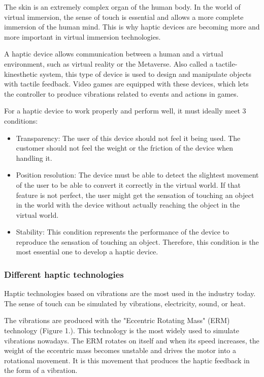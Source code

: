 \documentclass[12pt, a4paper]{article}
\begin{document}
\begin{multicols}{2}
\par The skin is an extremely complex organ of the human body. In the world of virtual immersion, the sense of touch is essential and allows a more complete immersion of the human mind. This is why haptic devices are becoming more and more important in virtual immersion technologies.
\par A haptic device allows communication between a human and a virtual environment, such as virtual reality or the Metaverse. Also called a tactile-kinesthetic system, this type of device is used to design and manipulate objects with tactile feedback. Video games are equipped with these devices, which lets the controller to produce vibrations related to events and actions in games.\cite{haptic5}
\par For a haptic device to work properly and perform well, it must ideally meet 3 conditions:
\begin{itemize}
    \item Transparency: The user of this device should not feel it being used. The customer should not feel the weight or the friction of the device when handling it.
    \item Position resolution: The device must be able to detect the slightest movement of the user to be able to convert it correctly in the virtual world. If that feature is not perfect, the user might get the sensation of touching an object in the world with the device without actually reaching the object in the virtual world.
    \item Stability: This condition represents the performance of the device to reproduce the sensation of touching an object. Therefore, this condition is the most essential one to develop a haptic device.\cite{haptic3}
\end{itemize}

\subsubsection{Different haptic technologies}

\par Haptic technologies based on vibrations are the most used in the industry today. The sense of touch can be simulated by vibrations, electricity, sound, or heat.
\par The vibrations are produced with the "Eccentric Rotating Mass" (ERM) technology (Figure 1.). This technology is the most widely used to simulate vibrations nowadays. The ERM rotates on itself and when its speed increases, the weight of the eccentric mass becomes unstable and drives the motor into a rotational movement. It is this movement that produces the haptic feedback in the form of a vibration\cite{TBHMI}.


\end{multicols}
\end{document}
